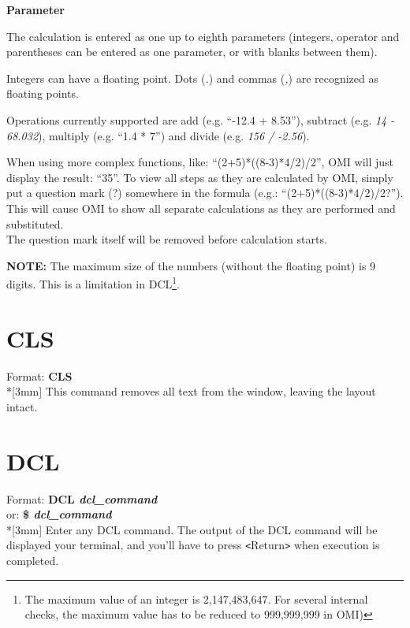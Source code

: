 \documentclass[a4paper]{book}
\newcommand{\vs}{\vspace{3mm}}
\newcommand{\lt}{\texttt{<}}
\newcommand{\gt}{\texttt{>}}
\renewcommand{\indent}{\hspace*{5mm}}
\begin{document}
\vs

\textbf{Parameter}

\noindent The calculation is entered as one up to eighth parameters (integers, 
operator and parentheses can be entered as one parameter, or with blanks 
between them).

Integers can have a floating point. Dots (\textsl{.}) and commas (\textsl{,}) are recognized 
as floating points.

Operations currently supported are add (e.g. ``-12.4 + 8.53''), subtract (e.g. 
\textsl{14 - 68.032}), multiply (e.g. ``1.4 * 7'') and divide
(e.g. \textsl{156 / -2.56}).

\vs

When using more complex functions, like: ``(2+5)*((8-3)*4/2)/2'', OMI 
will just display the result: ``35''. To view all steps as they are 
calculated by OMI, simply put a question mark (?) somewhere in the formula 
(e.g.: ``(2+5)*((8-3)*4/2)/2?''). This will cause OMI to show all 
separate calculations as they are performed and substituted. \\
The question mark itself will be removed before calculation starts.

\vs

\hspace{-8mm}\textbf{NOTE:} The maximum size of the numbers (without the floating point) 
is 9 digits. This is a limitation in DCL\footnote{ The maximum value of an 
integer is 2,147,483,647. For several internal checks, the maximum value has to be 
reduced to 999,999,999 in OMI)}.

\section{CLS}

\indent Format: \textbf{CLS}\\*[3mm]
This command removes all text from the window, leaving the layout intact.

\section{DCL}
\label{subsec:mylabel12}

\indent Format: \textbf{DCL \textit{dcl{\_}command}} \\
\indent or: \textbf{{\$} \textit{dcl{\_}command}}\\*[3mm]
Enter any DCL command. The output of the DCL command will be displayed your 
terminal, and you'll have to press \lt Return\gt{} when execution is completed.
\end{document}
